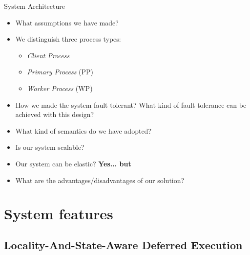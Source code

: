 \documentclass[10pt]{beamer}
\begin{document}
\begin{frame}{System Architecture}{}

\begin{itemize}

\item What assumptions we have made?

\item We distinguish three process types: 
\vspace{10pt}
\begin{itemize}
\item \textit{Client Process}
\item \textit{Primary Process} (PP) 
\item \textit{Worker Process} (WP)
\end{itemize}
\vspace{10pt}

\item How we made the system fault tolerant? What kind of fault tolerance can be achieved with this design?
\item What kind of semantics do we have adopted?
\item Is our system scalable?
\item Our system can be elastic? \textbf{Yes... but}
\item What are the advantages/disadvantages of our solution?
\end{itemize}
\end{frame}

\section{System features}


\subsection{Locality-And-State-Aware Deferred Execution} 
\end{document}

